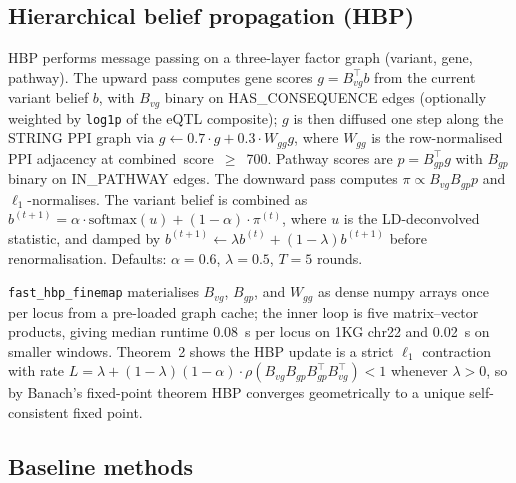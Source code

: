 \subsection*{Hierarchical belief propagation (HBP)}\label{methods:hbp}

HBP performs message passing on a three-layer factor graph
(variant, gene, pathway). The upward pass computes gene scores
$g = B_{vg}^\top b$ from the current variant belief $b$, with
$B_{vg}$ binary on HAS\_CONSEQUENCE edges (optionally weighted by
\texttt{log1p} of the eQTL composite); $g$ is then diffused one
step along the STRING PPI graph via
$g \leftarrow 0.7 \cdot g + 0.3 \cdot W_{gg} g$, where $W_{gg}$ is
the row-normalised PPI adjacency at combined~score~$\geq$~700.
Pathway scores are $p = B_{gp}^\top g$ with $B_{gp}$ binary on
IN\_PATHWAY edges. The downward pass computes
$\pi \propto B_{vg} B_{gp} p$ and $\ell_1$-normalises. The variant
belief is combined as
$b^{(t+1)} = \alpha \cdot \text{softmax}(u) + (1{-}\alpha) \cdot \pi^{(t)}$,
where $u$ is the LD-deconvolved statistic, and damped by
$b^{(t+1)} \leftarrow \lambda b^{(t)} + (1{-}\lambda) b^{(t+1)}$
before renormalisation. Defaults: $\alpha{=}0.6$, $\lambda{=}0.5$,
$T{=}5$ rounds.

\texttt{fast\_hbp\_finemap} materialises $B_{vg}$, $B_{gp}$, and
$W_{gg}$ as dense numpy arrays once per locus from a pre-loaded
graph cache; the inner loop is five matrix--vector products, giving
median runtime 0.08~s per locus on 1KG chr22 and 0.02~s on smaller
windows. Theorem~2 shows the HBP update is a strict $\ell_1$
contraction with rate
$L = \lambda + (1-\lambda)(1-\alpha) \cdot \rho(B_{vg} B_{gp} B_{gp}^\top B_{vg}^\top) < 1$
whenever $\lambda > 0$, so by Banach's fixed-point theorem HBP
converges geometrically to a unique self-consistent fixed point.

\subsection*{Baseline methods}

